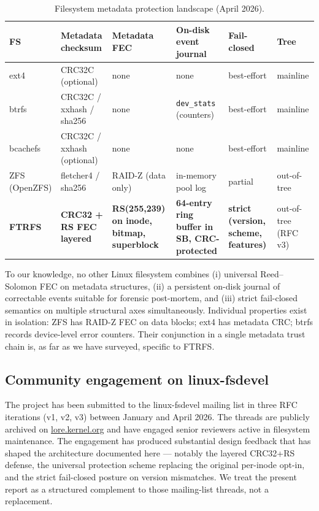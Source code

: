 \begin{table}[t]
\centering
\small
\caption{Filesystem metadata protection landscape (April 2026).}
\label{tab:fs-comparison}
\begin{tabularx}{\textwidth}{lXXXXl}
\toprule
\textbf{FS} &
\textbf{Metadata checksum} &
\textbf{Metadata FEC} &
\textbf{On-disk event journal} &
\textbf{Fail-closed} &
\textbf{Tree} \\
\midrule
ext4
  & CRC32C (optional)
  & none
  & none
  & best-effort
  & mainline \\
btrfs
  & CRC32C / xxhash / sha256
  & none
  & \texttt{dev\_stats} (counters)
  & best-effort
  & mainline \\
bcachefs
  & CRC32C / xxhash (optional)
  & none
  & none
  & best-effort
  & mainline \\
ZFS (OpenZFS)
  & fletcher4 / sha256
  & RAID-Z (data only)
  & in-memory pool log
  & partial
  & out-of-tree \\
\textbf{FTRFS}
  & \textbf{CRC32 + RS FEC layered}
  & \textbf{RS(255,239) on inode, bitmap, superblock}
  & \textbf{64-entry ring buffer in SB, CRC-protected}
  & \textbf{strict (version, scheme, features)}
  & out-of-tree (RFC v3) \\
\bottomrule
\end{tabularx}
\end{table}

To our knowledge, no other Linux filesystem combines (i) universal
Reed--Solomon FEC on metadata structures, (ii) a persistent on-disk
journal of correctable events suitable for forensic post-mortem,
and (iii) strict fail-closed semantics on multiple structural axes
simultaneously. Individual properties exist in isolation: ZFS has
RAID-Z FEC on data blocks; ext4 has metadata CRC; btrfs records
device-level error counters. Their conjunction in a single
metadata trust chain is, as far as we have surveyed, specific to
FTRFS.

\subsection{Community engagement on linux-fsdevel}

The project has been submitted to the linux-fsdevel mailing list
in three RFC iterations (v1, v2, v3) between January and April
2026. The threads are publicly archived on
\url{lore.kernel.org} and have engaged senior reviewers active in
filesystem maintenance. The engagement has produced substantial
design feedback that has shaped the architecture documented here ---
notably the layered CRC32+RS defense, the universal protection
scheme replacing the original per-inode opt-in, and the strict
fail-closed posture on version mismatches. We treat the present
report as a structured complement to those mailing-list threads,
not a replacement.

